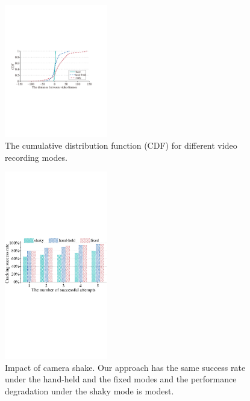 \begin{figure}[t!]
    \centering
    \vspace{-3mm}
    \includegraphics[width=0.4\textwidth]{fig/13.pdf}
    \vspace{-2mm}
    \caption{The cumulative distribution function (CDF) for different video recording modes.}
    \label{fig:fig13}
    \vspace{-3mm}
\end{figure}

\begin{figure}[!t]
    \centering
    \includegraphics[width=0.4\textwidth]{fig/14.pdf}
    \vspace{-2mm}
    \caption{Impact of camera shake. Our approach has the same success rate under the hand-held and the fixed modes and the performance degradation under the shaky mode is modest. }
    \label{fig:fig14}
    \vspace{-3mm}
\end{figure}


